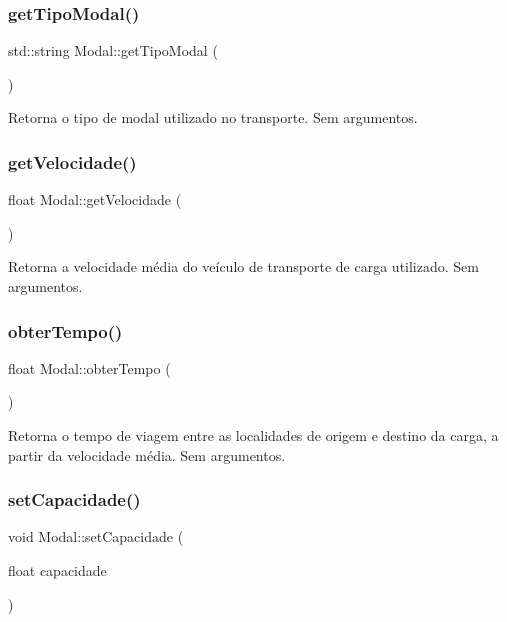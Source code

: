 \subsubsection{\texorpdfstring{get\+Tipo\+Modal()}{getTipoModal()}}
{\footnotesize\ttfamily std\+::string Modal\+::get\+Tipo\+Modal (\begin{DoxyParamCaption}{ }\end{DoxyParamCaption})}

Retorna o tipo de modal utilizado no transporte. Sem argumentos.\mbox{\label{classModal_acac9a4b13c4596842253e25f84872b32}} 
\subsubsection{\texorpdfstring{get\+Velocidade()}{getVelocidade()}}
{\footnotesize\ttfamily float Modal\+::get\+Velocidade (\begin{DoxyParamCaption}{ }\end{DoxyParamCaption})}

Retorna a velocidade média do veículo de transporte de carga utilizado. Sem argumentos.\mbox{\label{classModal_a71e2bda54694608c149ae0d72b3693a4}} 
\subsubsection{\texorpdfstring{obter\+Tempo()}{obterTempo()}}
{\footnotesize\ttfamily float Modal\+::obter\+Tempo (\begin{DoxyParamCaption}{ }\end{DoxyParamCaption})}

Retorna o tempo de viagem entre as localidades de origem e destino da carga, a partir da velocidade média. Sem argumentos.\mbox{\label{classModal_affd03b3938af5cbe3541f82ae5ad8b6a}} 
\subsubsection{\texorpdfstring{set\+Capacidade()}{setCapacidade()}}
{\footnotesize\ttfamily void Modal\+::set\+Capacidade (\begin{DoxyParamCaption}\item[{float}]{capacidade }\end{DoxyParamCaption})}

